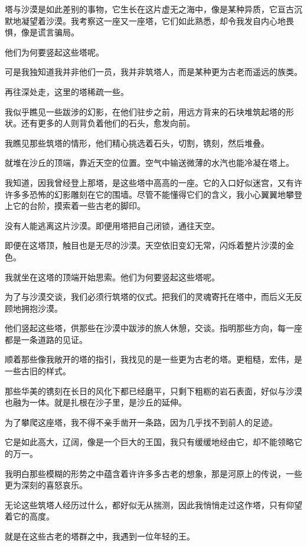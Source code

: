 \documentclass[UTF8]{article}
\begin{document}
\par 塔与沙漠是如此差别的事物，它生长在这片虚无之海中，像是某种异质，它亘古沉默地凝望着沙漠。我考察这一座又一座塔，它们如此熟悉，却令我发自内心地畏惧，像是谎言骗局。
\par 他们为何要竖起这些塔呢。
\par 可是我独知道我并非他们一员，我并非筑塔人，而是某种更为古老而遥远的族类。
\\[0.6cm]
\par 再往深处走，这里的塔稀疏一些。
\par 我似乎瞧见一些跋涉的幻影，在他们驻步之前，用远方背来的石块堆筑起塔的形状。还有更多的人则背负着他们的石头，愈发向前。
\par 我瞧见那些筑塔的情形，他们精心挑选着石头，切割，镌刻，然后堆叠。
\par 就堆在沙丘的顶端，靠近天空的位置。空气中输送微薄的水汽也能冷凝在塔上。
\par 我知道，因我曾经登上那塔，是这些塔中高高的一座。它的入口好似迷宫，又有许许多多恐怖的幻影雕刻在它的围墙。尽管不能懂得它们的含义，我小心翼翼地攀登上它的台阶，摸索着一些古老的脚印。
\par 没有人能逃离这片沙漠。即便用塔把自己闭锁，通往天空。
\par 即便在这塔顶，触目也是无尽的沙漠。天空依旧变幻无常，闪烁着整片沙漠的金色。
\par 我就坐在这塔的顶端开始思索。他们为何要竖起这些塔呢。
\par 为了与沙漠交谈，我们必须行筑塔的仪式。把我们的灵魂寄托在塔中，而后义无反顾地拥抱沙漠。
\par 他们竖起这些塔，供那些在沙漠中跋涉的旅人休憩，交谈。指明那些方向，每一座都是一条道路的见证。
\\[0.6cm]
\par 顺着那些像我敞开的塔的指引，我找见的是一些更为古老的塔。更粗糙，宏伟，是一些古旧的样式。
\par 那些华美的镌刻在长日的风化下都已经磨平，只剩下粗粝的岩石表面，好似与沙漠也融为一体。就是扎根在沙子里，是沙丘的延伸。
\par 为了攀爬这座塔，我不得不亲手凿开一条路，因为几乎找不到前人的足迹。
\par 它是如此高大，辽阔，像是一个巨大的王国，我只有缓缓地经由它，却不能领略它的万一。
\par 我明白那些模糊的形势之中蕴含着许许多多古老的想象，那是河原上的传说，一些更为深刻的喜怒哀乐。
\par 无论这些筑塔人经历过什么，都好似无从揣测，因此我悄悄走过这作塔，只有仰望着它的高度。
\par 就是在这些古老的塔群之中，我遇到一位年轻的王。
\end{document}

